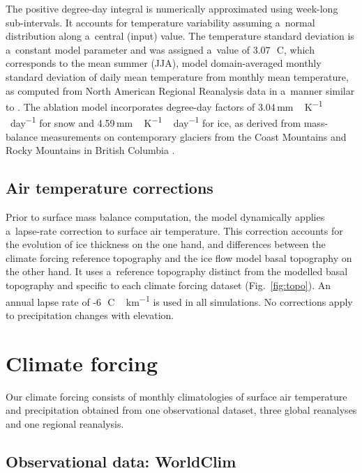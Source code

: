 \documentclass[tc, ms]{copernicus}
\begin{document}
The positive degree-day integral \citep{calov-greve-2005} is numerically approximated using week-long sub-intervals. It accounts for temperature variability assuming a~normal distribution along a~central (input) value. The temperature standard deviation is a~constant model parameter and was assigned a~value of 3.07\,\unit{{\degree}C}, which corresponds to the mean summer (JJA), model domain-averaged monthly standard deviation of daily mean temperature from monthly mean temperature, as computed from North American Regional Reanalysis data \citep{data:narr} in a~manner similar to \citet{seguinot-2013}. The ablation model incorporates degree-day factors of 3.04\,\unit{mm\,K^{-1}\,day^{-1}} for snow and 4.59\,\unit{mm\,K^{-1}\,day^{-1}} for ice, as derived from mass-balance measurements on contemporary glaciers from the Coast Mountains and Rocky Mountains in British Columbia \citep{shea-etal-2009}.

\subsection{Air temperature corrections}

Prior to surface mass balance computation, the model dynamically applies a~lapse-rate correction to surface air temperature. This correction accounts for the evolution of ice thickness on the one hand, and differences between the climate forcing reference topography and the ice flow model basal topography on the other hand. It uses a~reference topography distinct from the modelled basal topography and specific to each climate forcing dataset (Fig.~\ref{fig:topo}). An annual lapse rate of -6\,\unit{{\degree}C\,km^{-1}} is used in all simulations. No corrections apply to precipitation changes with elevation.

\section{Climate forcing}
\label{sec:climate}

Our climate forcing consists of monthly climatologies of surface air temperature and precipitation obtained from one observational dataset, three global reanalyses and one regional reanalysis.

\subsection{Observational data: WorldClim}
\end{document}
